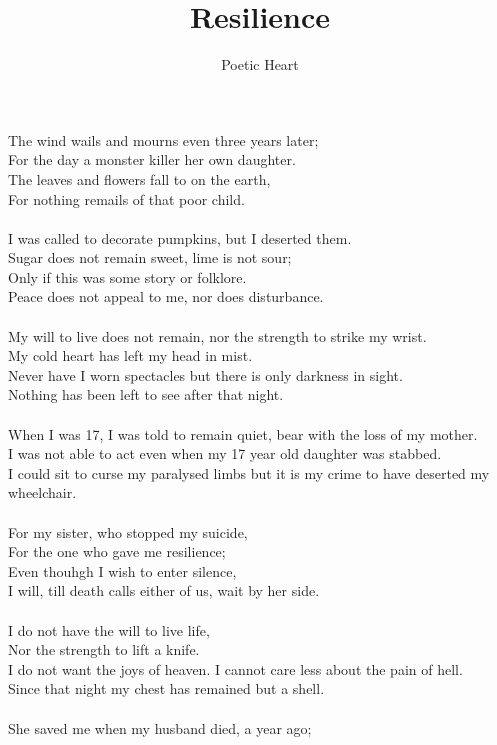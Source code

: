 \documentclass{article}
\title{Resilience}
\author{Poetic Heart}
\begin{document}
\maketitle
The wind wails and mourns even three years later;
\\For the day a monster killer her own daughter.
\\The leaves and flowers fall to on the earth,
\\For nothing remails of that poor child.
\\
\\I was called to decorate pumpkins, but I deserted them.
\\Sugar does not remain sweet, lime is not sour;
\\Only if this was some story or folklore.
\\Peace does not appeal to me, nor does disturbance.
\\
\\My will to live does not remain, nor the strength to strike my wrist.
\\My cold heart has left my head in mist.
\\Never have I worn spectacles but there is only darkness in sight.
\\Nothing has been left to see after that night.
\\
\\When I was 17, I was told to remain quiet, bear with the loss of my mother.
\\I was not able to act even when my 17 year old daughter was stabbed.
\\I could sit to curse my paralysed limbs but it is my crime to have deserted my wheelchair. 
\\
\\For my sister, who stopped my suicide,
\\For the one who gave me resilience;
\\Even thouhgh I wish to enter silence,
\\I will, till death calls either of us, wait by her side. 
\\
\\I do not have the will to live life,
\\Nor the strength to lift a knife.
\\I do not want the joys of heaven. I cannot care less about the pain of hell.
\\Since that night my chest has remained but a shell.
\\
\\She saved me when my husband died, a year ago;
\end{document}
